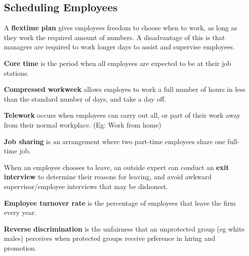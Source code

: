 \documentclass[english, 12pt]{article}
\begin{document}
\subsection{Scheduling Employees}
\begin{defn}
A \textbf{flextime plan} gives employees freedom to choose when to work, as long as they work the required amount of numbers. A disadvantage of this is that managers are required to work longer days to assist and supervise employees.
\end{defn}
\begin{defn}
\textbf{Core time} is the period when all employees are expected to be at their job stations.
\end{defn}
\begin{defn}
\textbf{Compressed workweek} allows employes to work a full number of hours in less than the standard number of days, and take a day off.
\end{defn}
\begin{defn}
\textbf{Telework} occurs when employees can carry out all, or part of their work away from their normal workplace. (Eg: Work from home)
\end{defn}
\begin{defn}
\textbf{Job sharing} is an arrangement where two part-time employees share one full-time job.
\end{defn}
\begin{defn}
When an employee chooses to leave, an outside expert can conduct an \textbf{exit interview} to determine their reasons for leaving, and avoid awkward supervisor/employee interviews that may be dishonest.
\end{defn}
\begin{defn}
\textbf{Employee turnover rate} is the percentage of employees that leave the firm every year.
\end{defn}
\begin{defn}
\textbf{Reverse discrimination} is the unfairness that an unprotected group (eg white males) perceives when protected groups receive prference in hiring and promotion.
\end{defn}
\end{document}
